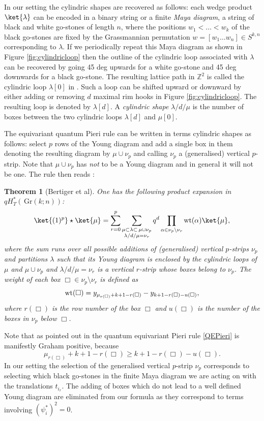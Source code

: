 \documentclass[12pt]{amsart}
\newcommand{\Z}{\mathbb{Z}}
\newcommand{\Gr}{\,\mathrm{Gr}}
\newtheorem{thm}{Theorem}[section]
\numberwithin{equation}{section}
\numberwithin{figure}{section}
\begin{document}
In our setting the cylindric shapes are recovered as follows: each wedge product $\ket{\lambda}$ can be encoded in a binary string or a finite {\em Maya diagram}, a string of black and white go-stones of length $n$, where the positions $w_1<\ldots<w_k$ of the black go-stones are fixed by the Grassmannian permutation $w=[w_1\ldots w_n]\in S^{k,n}$ corresponding to $\lambda$. If we periodically repeat this Maya diagram as shown in Figure \ref{fig:cylindricloop} then the outline of the cylindric loop associated with $\lambda$ can be recovered by going 45 deg upwards for a white go-stone and 45 deg downwards for a black go-stone. The resulting lattice path in $\Z^2$ is called the cylindric loop $\lambda[0]$ in \cite{Post05}. Such a loop can be shifted upward or downward by either adding or removing $d$ maximal rim hooks in Figure \ref{fig:cylindricloop}. The resulting loop is denoted by $\lambda[d]$. A {\em cylindric shape} $\lambda/d/\mu$ is the number of boxes between the two cylindric loops $\lambda[d]$ and $\mu[0]$. 

The equivariant quantum Pieri rule can be written in terms cylindric shapes as follows: select $p$ rows of the Young diagram and add a single box in them denoting the resulting diagram by $\mu\cup\nu_p$ and calling $\nu_p$ a (generalised) vertical $p$-strip. Note that $\mu\cup\nu_p$ has {\em not} to be a Young diagram and in general it will not be one. The rule then reads \cite[Theorem 1]{BEMT22}:
\begin{thm}[Bertiger et al] One has the following product expansion in $qH^*_T(\Gr(k;n))$:
        \begin{equation}
        \label{QEPieri}
            \ket{(1)^p} \star \ket{\mu} = \sum\limits_{r = 0}^{p} \sum\limits_{\substack{\mu \subset \lambda \subset\, \mu \cup \nu_p \\\lambda /d/\mu = \nu_r}} q^d \prod\limits_{\alpha \in \nu_p  \setminus \nu_r} \rm{wt}(\alpha) \ket{\mu},
        \end{equation}
        where the sum runs over all possible additions of (generalised) vertical $p$-strips $\nu_p$ and partitions $\lambda$ such that its Young diagram is enclosed by the cylindric loops of $\mu$ and $\mu \cup \nu_p$ and $\lambda/d/\mu=\nu_r$ is a vertical $r$-strip whose boxes belong to $\nu_p$. The weight of each box $\Box \in \nu_p \setminus \nu_r$ is defined as
        \[
        {\rm{wt}}(\Box) = y_{\mu_{r(\Box)} + k + 1 - r(\Box)} - y_{k + 1 - r(\Box) - u({\Box})},
        \]
        where $r(\Box)$ is the row number of the box $\Box$ and $u(\Box)$ is the number of the boxes in $\nu_p$ below $\Box$. 
\end{thm}        
        Note that as pointed out in \cite{BEMT22} the quantum equivariant Pieri rule \eqref{QEPieri} is manifestly Graham positive, because
        \[
        \mu_{r(\Box)} + k + 1 - r(\Box) \geq k + 1 - r(\Box) - u(\Box).
        \]
In our setting the selection of the generalised vertical $p$-strip $\nu_p$ corresponds to selecting which black go-stones in the finite Maya diagram we are acting on with the translations $t_{i_r}$. The adding of boxes which do not lead to a well defined Young diagram are eliminated from our formula as they correspond to terms involving $(\psi^*_i)^2=0$.
\end{document}
